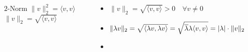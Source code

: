 \begin{frame}[t]
\begin{columns}[t,onlytextwidth]
\begin{column}{0.28\textwidth}
\begin{block}{$2$-Norm}
$\|v\|_2^2 = \langle v,v\rangle$
\\
$\|v\|_2 = \sqrt{\langle v,v\rangle}$
\end{block}
\end{column}
\begin{column}{0.78\textwidth}
\begin{itemize}
\item $\|v\|_2 = \sqrt{\langle v,v\rangle} > 0\quad\forall v\ne 0$
\item $\| \lambda v \|_2
=
\sqrt{\langle \lambda v,\lambda v\rangle\mathstrut}
=
\sqrt{\overline{\lambda}\lambda\langle v,v\rangle}
=
|\lambda|\cdot \|v\|_2$
\item
{}
\end{itemize}
\end{column}
\end{columns}
\end{frame}
